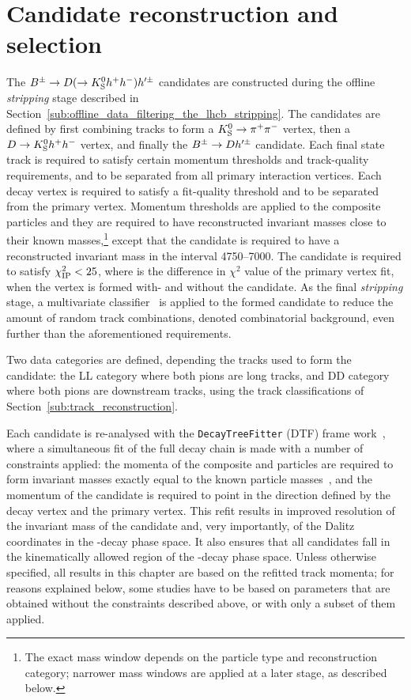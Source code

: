 \section{Candidate reconstruction and selection} %
\label{sec:candidate_selection}

The ${{B}^\pm}\rightarrow{\ensuremath{D}}(\rightarrow{\ensuremath{{K}^0_{\mathrm{S}}}} h^+h^-)h'^\pm$ candidates are constructed during the offline \emph{stripping} stage described in Section~\ref{sub:offline_data_filtering_the_lhcb_stripping}. The candidates are defined by first combining tracks to form a ${{K}^0_{\mathrm{S}}}\rightarrow{\ensuremath{{\pi}^+}}{\ensuremath{{\pi}^-}}$ vertex, then a ${D}\rightarrow{\ensuremath{{K}^0_{\mathrm{S}}}} h^+h^-$ vertex, and finally the ${{B}^\pm}\rightarrow{\ensuremath{D}} h'^\pm$ candidate. Each final state track is required to satisfy certain momentum thresholds and track-quality requirements, and to be separated from all primary interaction vertices. Each decay vertex is required to satisfy a fit-quality threshold and to be separated from the primary vertex. Momentum thresholds are applied to the composite particles and they are required to have reconstructed invariant masses close to their known masses,\footnote{The exact mass window depends on the particle type and reconstruction category; narrower mass windows are applied at a later stage, as described below.} except that the \B candidate is required to have a reconstructed invariant mass in the interval 4750--7000\mevcc. The \B candidate is required to satisfy $\chi^2_{\text{IP}} <25$, where \ipchisq is the difference in $\chi^2$ value of the primary vertex fit, when the vertex is formed with- and without the \B candidate. As the final \emph{stripping} stage, a multivariate classifier~\cite{gligorovEfficientReliableFast2013} is applied to the formed \B candidate to reduce the amount of random track combinations, denoted combinatorial background, even further than the aforementioned requirements.

Two data categories are defined, depending the tracks used to form the \KS candidate: the LL category where both pions are long tracks, and DD category where both pions are downstream tracks, using the track classifications of Section~\ref{sub:track_reconstruction}.


Each candidate is re-analysed with the \texttt{DecayTreeFitter} (DTF) frame work~\cite{DTF}, where a simultaneous fit of the full decay chain is made with a number of constraints applied: the momenta of the composite \D and \KS particles are required to form invariant masses exactly equal to the known particle masses~\cite{PDG2020}, and the momentum of the \B candidate is required to point in the direction defined by the \B decay vertex and the primary vertex. This refit results in improved resolution of the invariant mass of the \B candidate and, very importantly, of the Dalitz coordinates in the \D-decay phase space. It also ensures that all candidates fall in the kinematically allowed region of the \D-decay phase space. Unless otherwise specified, all results in this chapter are based on the refitted track momenta; for reasons explained below, some studies have to be based on parameters that are obtained without the constraints described above, or with only a subset of them applied.



